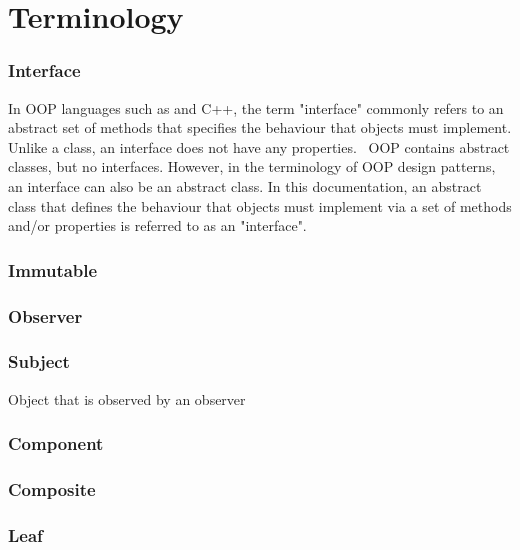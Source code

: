 \section{Terminology}
\subsubsection*{Interface} \label{sec:interface}
In OOP languages such as \java and C++, the term "interface" commonly refers to an abstract set of methods that specifies the behaviour that objects must implement. Unlike a class, an interface does not have any properties. \matlab\ OOP contains abstract classes, but no interfaces. However, in the terminology of OOP design patterns, an interface can also be an abstract class. In this documentation, an abstract class that defines the behaviour that objects must implement via a set of methods and/or properties is referred to as an "interface".
\subsubsection*{Immutable}
\subsubsection*{Observer}
\subsubsection*{Subject}
Object that is observed by an observer
\subsubsection*{Component}
\subsubsection*{Composite}
\subsubsection*{Leaf}